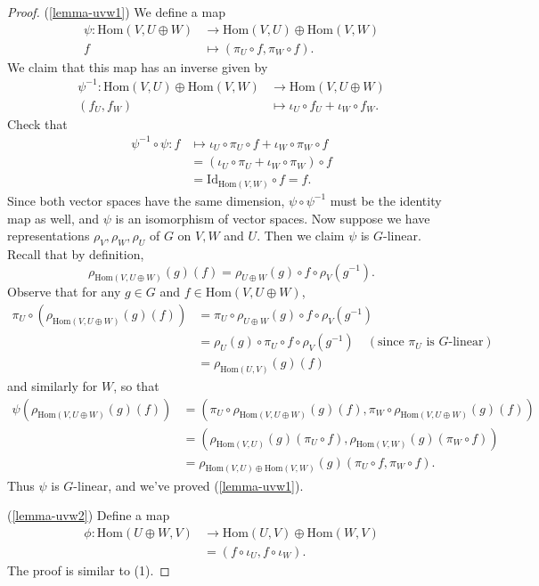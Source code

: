 \begin{proof}
(\ref{lemma-uvw1}) We define a map
\begin{align*}
 \psi \colon \text{Hom}(V, U \oplus W) &\to \text{Hom}(V,U) \oplus \text{Hom}(V,W) \\
 f  &\mapsto (\pi_U \circ f, \pi_W \circ f). 
\end{align*}
We claim that this map has an inverse	given by 
\begin{align*}
 \psi^{-1} \colon \text{Hom}(V,U) \oplus \text{Hom}(V,W) &\to \text{Hom}(V, U \oplus W) \\
 (f_U ,f_W) &\mapsto \iota_U \circ f_U + \iota_W \circ f_W.
\end{align*}
Check that
\begin{align*}
\psi^{-1} \circ \psi \colon f &\mapsto \iota_U \circ \pi_U \circ f + \iota_W \circ \pi_W \circ f \\
&= (\iota_U \circ \pi_U + \iota_W \circ \pi_W) \circ f\\
&= \text{Id}_{\text{Hom}(V,W)} \circ f = f.
\end{align*}
Since both vector spaces have the same dimension, $\psi \circ \psi^{-1}$ must be the identity map as well, and $\psi$ is an isomorphism of vector spaces.  Now suppose we have representations $\rho_V, \rho_W, \rho_U$ of $G$ on $V, W$ and $U$.  Then we claim $\psi$ is $G$-linear.  Recall that by definition, 
\[ \rho_{\text{Hom}(V, U \oplus W)}(g)(f) = \rho_{U \oplus W} (g) \circ f \circ \rho_V (g^{-1}).\]
Observe that for any $g \in G$ and  $f \in \text{Hom}(V, U \oplus W)$,
\begin{align*}
 \pi_U \circ ( \rho_{\text{Hom}(V, U \oplus W)}(g)(f) )&= \pi_U \circ \rho_{U \oplus W} (g) \circ f \circ \rho_V (g^{-1}) \\
 &= \rho_U (g) \circ \pi_U  \circ f \circ \rho_V (g^{-1}) \quad (\text{since } \pi_U \text{ is }G\text{-linear}) \\
 &=\rho_{\text{Hom}(U,V)}(g)(f)
 \end{align*}
 and similarly for $W$, so that 
 \begin{align*}
\psi ( \rho_{\text{Hom}(V, U \oplus W)}(g)(f)) &= (\pi_U \circ \rho_{\text{Hom}(V, U \oplus W)}(g)(f), \pi_W \circ \rho_{\text{Hom}(V,U \oplus W)}(g)(f)) \\
&=(\rho_{\text{Hom}(V,U)}(g)(\pi_U \circ f), \rho_{\text{Hom}(V,W)}(g)(\pi_W \circ f)) \\
&= \rho_{\text{Hom}(V,U) \oplus \text{Hom}(V,W)}(g)(\pi_U \circ f, \pi_W \circ f).
 \end{align*}
Thus $\psi$ is $G$-linear, and we've proved (\ref{lemma-uvw1}).

(\ref{lemma-uvw2})  Define a map
\begin{align*}
\phi \colon \text{Hom}(U \oplus W, V) &\to \text{Hom}(U,V) \oplus \text{Hom}(W,V) \\
&= (f \circ \iota_U, f \circ \iota_W).
\end{align*}
The proof is similar to (1).
\end{proof}

